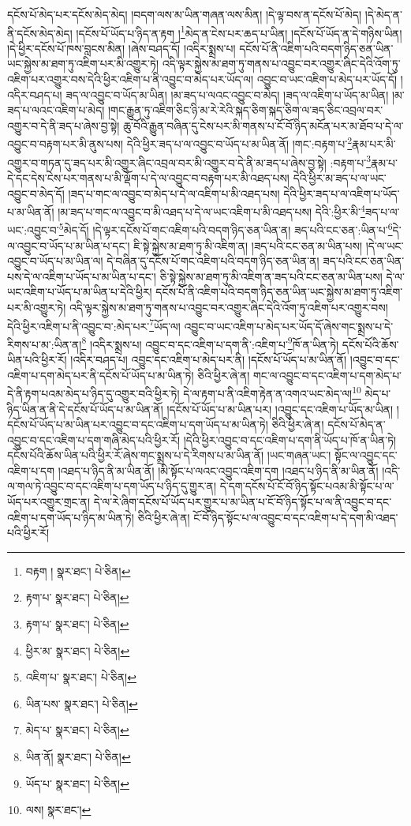 དངོས་པོ་མེད་པར་དངོས་མེད་མེད། །བདག་ལས་མ་ཡིན་གཞན་ལས་མིན། །དེ་ལྟ་བས་ན་དངོས་པོ་མེད། །དེ་མེད་ན་ནི་དངོས་མེད་མེད། །དངོས་པོ་ཡོད་པ་ཉིད་ན་རྟག །\footnote{བརྟག །  སྣར་ཐང་།  པེ་ཅིན། }མེད་ན་ངེས་པར་ཆད་པ་ཡིན། །དངོས་པོ་ཡོད་ན་དེ་གཉིས་ཡིན། །དེ་ཕྱིར་དངོས་པོ་ཁས་བླངས་མིན། །ཞེས་བཤད་དོ། །འདིར་སྨྲས་པ། དངོས་པོ་ནི་འཇིག་པའི་བདག་ཉིད་ཅན་ཡིན་ཡང་སྐྱེས་མ་ཐག་ཏུ་འཇིག་པར་མི་འགྱུར་ཏེ། འདི་ལྟར་སྐྱེས་མ་ཐག་ཏུ་གནས་པ་འབྱུང་བར་འགྱུར་ཞིང་དེའི་འོག་ཏུ་འཇིག་པར་འགྱུར་བས་དེའི་ཕྱིར་འཇིག་པ་ནི་འབྱུང་བ་མེད་པར་ཡོད་ལ། འབྱུང་བ་ཡང་འཇིག་པ་མེད་པར་ཡོད་དོ། །འདིར་བཤད་པ། ཟད་ལ་འབྱུང་བ་ཡོད་མ་ཡིན། །མ་ཟད་པ་ལའང་འབྱུང་བ་མེད། །ཟད་ལ་འཇིག་པ་ཡོད་མ་ཡིན། །མ་ཟད་པ་ལའང་འཇིག་པ་མེད། །གང་རྒྱུན་ཏུ་འཇིག་ཅིང་ཉི་མ་རེ་རེའི་སྐད་ཅིག་སྐད་ཅིག་ལ་ཟད་ཅིང་འབྲལ་བར་འགྱུར་བ་དེ་ནི་ཟད་པ་ཞེས་བྱ་སྟེ། ཆུ་བོའི་རྒྱུན་བཞིན་དུ་ངེས་པར་མི་གནས་པ་ངོ་བོ་ཉིད་མངོན་པར་མ་ཐོབ་པ་དེ་ལ་འབྱུང་བ་བརྟག་པར་མི་ནུས་པས། དེའི་ཕྱིར་ཟད་པ་ལ་འབྱུང་བ་ཡོད་པ་མ་ཡིན་ནོ། །གང་:བརྟག་པ་\footnote{རྟག་པ་  སྣར་ཐང་།  པེ་ཅིན། }རྣམ་པར་མི་འགྱུར་བ་གཏན་དུ་ཟད་པར་མི་འགྱུར་ཞིང་འབྲལ་བར་མི་འགྱུར་བ་དེ་ནི་མ་ཟད་པ་ཞེས་བྱ་སྟེ། :བརྟག་པ་\footnote{རྟག་པ་  སྣར་ཐང་།  པེ་ཅིན། }རྣམ་པ་དེ་དང་དེས་ངེས་པར་གནས་པ་མི་ལྡོག་པ་དེ་ལ་འབྱུང་བ་བརྟག་པར་མི་འཐད་པས། དེའི་ཕྱིར་མ་ཟད་པ་ལ་ཡང་འབྱུང་བ་མེད་དོ། །ཟད་པ་གང་ལ་འབྱུང་བ་མེད་པ་དེ་ལ་འཇིག་པ་མི་འཐད་པས། དེའི་ཕྱིར་ཟད་པ་ལ་འཇིག་པ་ཡོད་པ་མ་ཡིན་ནོ། །མ་ཟད་པ་གང་ལ་འབྱུང་བ་མི་འཐད་པ་དེ་ལ་ཡང་འཇིག་པ་མི་འཐད་པས། དེའི་:ཕྱིར་མི་\footnote{ཕྱིར་མ་  སྣར་ཐང་།  པེ་ཅིན། }ཟད་པ་ལ་ཡང་:འབྱུང་བ་\footnote{འཇིག་པ་  སྣར་ཐང་།  པེ་ཅིན། }མེད་དོ། །དེ་ལྟར་དངོས་པོ་གང་འཇིག་པའི་བདག་ཉིད་ཅན་ཡིན་ན། ཟད་པའི་ངང་ཅན་:ཡིན་པ་\footnote{ཡིན་པས་  སྣར་ཐང་།  པེ་ཅིན། }དེ་ལ་འབྱུང་བ་ཡོད་པ་མ་ཡིན་པ་དང་། ཇི་སྟེ་སྐྱེས་མ་ཐག་ཏུ་མི་འཇིག་ན། །ཟད་པའི་ངང་ཅན་མ་ཡིན་པས། །དེ་ལ་ཡང་འབྱུང་བ་ཡོད་པ་མ་ཡིན་ལ། དེ་བཞིན་དུ་དངོས་པོ་གང་འཇིག་པའི་བདག་ཉིད་ཅན་ཡིན་ན། ཟད་པའི་ངང་ཅན་ཡིན་པས་དེ་ལ་འཇིག་པ་ཡོད་པ་མ་ཡིན་པ་དང་། ཅི་སྟེ་སྐྱེས་མ་ཐག་ཏུ་མི་འཇིག་ན་ཟད་པའི་ངང་ཅན་མ་ཡིན་པས། དེ་ལ་ཡང་འཇིག་པ་ཡོད་པ་མ་ཡིན་པ་དེའི་ཕྱིར། དངོས་པོ་ནི་འཇིག་པའི་བདག་ཉིད་ཅན་ཡིན་ཡང་སྐྱེས་མ་ཐག་ཏུ་འཇིག་པར་མི་འགྱུར་ཏེ། འདི་ལྟར་སྐྱེས་མ་ཐག་ཏུ་གནས་པ་འབྱུང་བར་འགྱུར་ཞིང་དེའི་འོག་ཏུ་འཇིག་པར་འགྱུར་བས། དེའི་ཕྱིར་འཇིག་པ་ནི་འབྱུང་བ་:མེད་པར་\footnote{མེད་པ་  སྣར་ཐང་།  པེ་ཅིན། }ཡོད་ལ། འབྱུང་བ་ཡང་འཇིག་པ་མེད་པར་ཡོད་དོ་ཞེས་གང་སྨྲས་པ་དེ་རིགས་པ་མ་:ཡིན་ན།\footnote{ཡིན་ནོ།  སྣར་ཐང་།  པེ་ཅིན། } །འདིར་སྨྲས་པ། འབྱུང་བ་དང་འཇིག་པ་དག་ནི་:འཇིག་པ་\footnote{ཡོད་པ་  སྣར་ཐང་།  པེ་ཅིན། }ཁོ་ན་ཡིན་ཏེ། དངོས་པོའི་ཆོས་ཡིན་པའི་ཕྱིར་རོ། །འདིར་བཤད་པ། འབྱུང་དང་འཇིག་པ་མེད་པར་ནི། །དངོས་པོ་ཡོད་པ་མ་ཡིན་ནོ། །འབྱུང་བ་དང་འཇིག་པ་དག་མེད་པར་ནི་དངོས་པོ་ཡོད་པ་མ་ཡིན་ཏེ། ཅིའི་ཕྱིར་ཞེ་ན། གང་ལ་འབྱུང་བ་དང་འཇིག་པ་དག་མེད་པ་དེ་ནི་རྟག་པའམ་མེད་པ་ཉིད་དུ་འགྱུར་བའི་ཕྱིར་ཏེ། དེ་ལ་རྟག་པ་ནི་འཇིག་རྟེན་ན་འགའ་ཡང་མེད་ལ།\footnote{ལས།  སྣར་ཐང་། } མེད་པ་ཉིད་ཡིན་ན་ནི་དེ་དངོས་པོ་ཡོད་པ་མ་ཡིན་ནོ། །དངོས་པོ་ཡོད་པ་མ་ཡིན་པར། །འབྱུང་དང་འཇིག་པ་ཡོད་མ་ཡིན། །དངོས་པོ་ཡོད་པ་མ་ཡིན་པར་འབྱུང་བ་དང་འཇིག་པ་དག་ཡོད་པ་མ་ཡིན་ཏེ། ཅིའི་ཕྱིར་ཞེ་ན། དངོས་པོ་མེད་ན་འབྱུང་བ་དང་འཇིག་པ་དག་གཞི་མེད་པའི་ཕྱིར་རོ། །དེའི་ཕྱིར་འབྱུང་བ་དང་འཇིག་པ་དག་ནི་ཡོད་པ་ཁོ་ན་ཡིན་ཏེ། དངོས་པོའི་ཆོས་ཡིན་པའི་ཕྱིར་རོ་ཞེས་གང་སྨྲས་པ་དེ་རིགས་པ་མ་ཡིན་ནོ། །ཡང་གཞན་ཡང་། སྟོང་ལ་འབྱུང་དང་འཇིག་པ་དག །འཐད་པ་ཉིད་ནི་མ་ཡིན་ནོ། །མི་སྟོང་པ་ལའང་འབྱུང་འཇིག་དག །འཐད་པ་ཉིད་ནི་མ་ཡིན་ནོ། །འདི་ལ་གལ་ཏེ་འབྱུང་བ་དང་འཇིག་པ་དག་ཡོད་པ་ཉིད་དུ་གྱུར་ན། དེ་དག་དངོས་པོ་ངོ་བོ་ཉིད་སྟོང་པའམ་མི་སྟོང་པ་ལ་ཡོད་པར་འགྱུར་གྲང་ན། དེ་ལ་རེ་ཞིག་དངོས་པོ་ཡོད་པར་གྱུར་པ་མ་ཡིན་པ་ངོ་བོ་ཉིད་སྟོང་པ་ལ་ནི་འབྱུང་བ་དང་འཇིག་པ་དག་ཡོད་པ་ཉིད་མ་ཡིན་ཏེ། ཅིའི་ཕྱིར་ཞེ་ན། ངོ་བོ་ཉིད་སྟོང་པ་ལ་འབྱུང་བ་དང་འཇིག་པ་དེ་དག་མི་འཐད་པའི་ཕྱིར་རོ། 